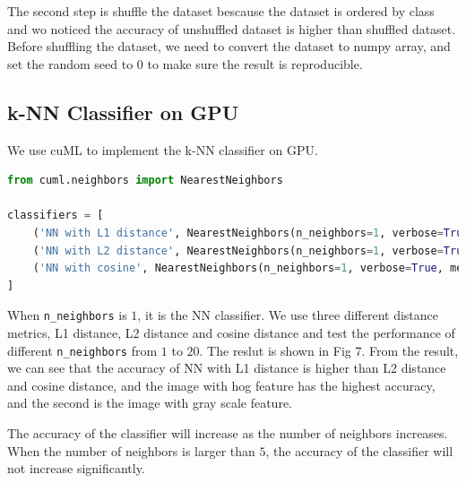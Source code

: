 \documentclass[11pt]{article}
\begin{document}
The second step is shuffle the dataset bescause the dataset is ordered by class and wo noticed the accuracy of unshuffled dataset is higher than shuffled dataset. 
Before shuffling the dataset, we need to convert the dataset to numpy array, and set the random seed to 0 to make sure the result is reproducible.

\subsection{k-NN Classifier on GPU}
We use cuML to implement the k-NN classifier on GPU. 
\begin{lstlisting}[language=Python, caption={k-NN Classifier on GPU}]
from cuml.neighbors import NearestNeighbors

classifiers = [
    ('NN with L1 distance', NearestNeighbors(n_neighbors=1, verbose=True, metric='l1')),
    ('NN with L2 distance', NearestNeighbors(n_neighbors=1, verbose=True, metric='l2')),
    ('NN with cosine', NearestNeighbors(n_neighbors=1, verbose=True, metric='cosine')),
]
\end{lstlisting}

When \verb|n_neighbors| is $1$, it is the NN classifier. We use three different distance metrics, L1 distance, L2 distance and cosine distance and test the performance of different \verb|n_neighbors| from $1$ to $20$.
The reslut is shown in Fig 7. From the result, we can see that the accuracy of NN with L1 distance is higher than L2 distance and cosine distance, and the image with hog feature has the highest accuracy, and the second is the image with gray scale feature.

The accuracy of the classifier will increase as the number of neighbors increases. 
When the number of neighbors is larger than $5$, the accuracy of the classifier will not increase significantly.
\end{document}

